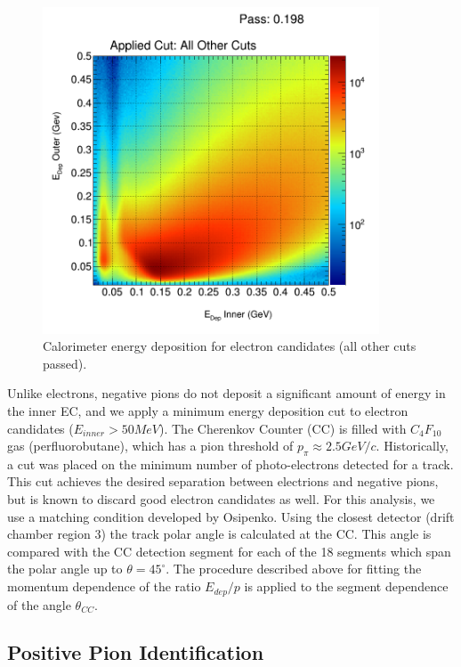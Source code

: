 \begin{figure}
  \label{fig:ec_edep}
  \begin{center}
    \includegraphics[width=10cm]{image/h_ec_edep_allOthers_all.png}
    \caption{Calorimeter energy deposition for electron candidates (all other cuts passed).}
  \end{center}
\end{figure}

Unlike electrons, negative pions do not deposit a significant amount of energy in the inner EC, and we apply a minimum energy deposition cut to electron candidates ($E_{inner} > 50 MeV$).  The Cherenkov Counter (CC) is filled with $C_{4}F_{10}$ gas (perfluorobutane), which has a pion threshold of $p_{\pi} \approx 2.5 GeV/c$.  Historically, a cut was placed on the minimum number of photo-electrons detected for a track.  This cut achieves the desired separation between electrions and negative pions, but is known to discard good electron candidates as well.  For this analysis, we use a matching condition developed by Osipenko.  Using the closest detector (drift chamber region 3) the track polar angle is calculated at the CC.  This angle is compared with the CC detection segment for each of the 18 segments which span the polar angle up to $\theta = 45^{\circ}$.  The procedure described above for fitting the momentum dependence of the ratio $E_{dep}/p$ is applied to the segment dependence of the angle $\theta_{CC}$.  
\\
\subsection{Positive Pion Identification}

